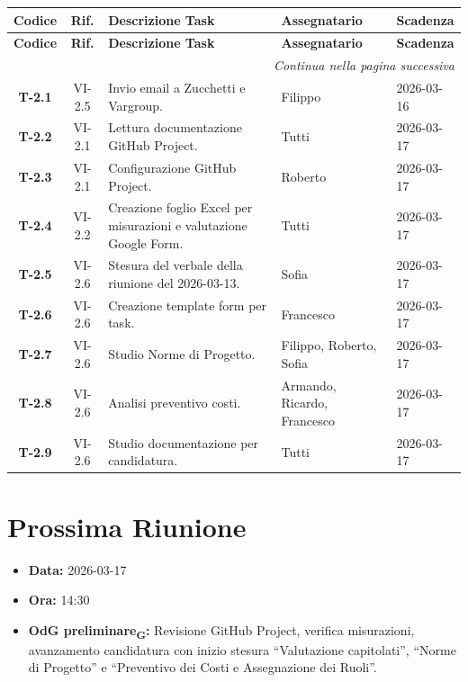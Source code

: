 \begin{longtable}{c c p{4.5cm} l l}
    \toprule
    \textbf{Codice} & \textbf{Rif.} & \textbf{Descrizione Task} & \textbf{Assegnatario} & \textbf{Scadenza} \\
    \midrule
    \endfirsthead

    \toprule
    \textbf{Codice} & \textbf{Rif.} & \textbf{Descrizione Task} & \textbf{Assegnatario} & \textbf{Scadenza} \\
    \midrule
    \endhead

    \midrule
    \multicolumn{5}{r}{\textit{Continua nella pagina successiva}} \\
    \midrule
    \endfoot

    \bottomrule
    \endlastfoot

    \textbf{T-2.1} & VI-2.5 & Invio email a Zucchetti e Vargroup. & Filippo & 2026-03-16 \\
    \textbf{T-2.2} & VI-2.1 & Lettura documentazione GitHub Project. & Tutti & 2026-03-17 \\
    \textbf{T-2.3} & VI-2.1 & Configurazione GitHub Project. & Roberto & 2026-03-17 \\
    \textbf{T-2.4} & VI-2.2 & Creazione foglio Excel per misurazioni e valutazione Google Form. & Tutti & 2026-03-17 \\
    \textbf{T-2.5} & VI-2.6 & Stesura del verbale della riunione del 2026-03-13. & Sofia & 2026-03-17 \\
    \textbf{T-2.6} & VI-2.6 & Creazione template form per task. & Francesco & 2026-03-17 \\
    \textbf{T-2.7} & VI-2.6 & Studio Norme di Progetto. & Filippo, Roberto, Sofia & 2026-03-17 \\
    \textbf{T-2.8} & VI-2.6 & Analisi preventivo costi. & Armando, Ricardo, Francesco & 2026-03-17 \\
    \textbf{T-2.9} & VI-2.6 & Studio documentazione per candidatura. & Tutti & 2026-03-17 \\
\end{longtable}

\section{Prossima Riunione}
\begin{itemize}
    \item \textbf{Data:} 2026-03-17
    \item \textbf{Ora:} 14:30
    \item \textbf{OdG preliminare\textsubscript{G}:} Revisione GitHub Project, verifica misurazioni, avanzamento candidatura con inizio stesura ``Valutazione capitolati'', ``Norme di Progetto'' e ``Preventivo dei Costi e Assegnazione dei Ruoli''.
\end{itemize}
